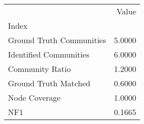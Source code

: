 \begin{tabular}{lr}
\toprule
{} &   Value \\
Index                    &         \\
\midrule
Ground Truth Communities &  5.0000 \\
Identified Communities   &  6.0000 \\
Community Ratio          &  1.2000 \\
Ground Truth Matched     &  0.6000 \\
Node Coverage            &  1.0000 \\
NF1                      &  0.1665 \\
\bottomrule
\end{tabular}
